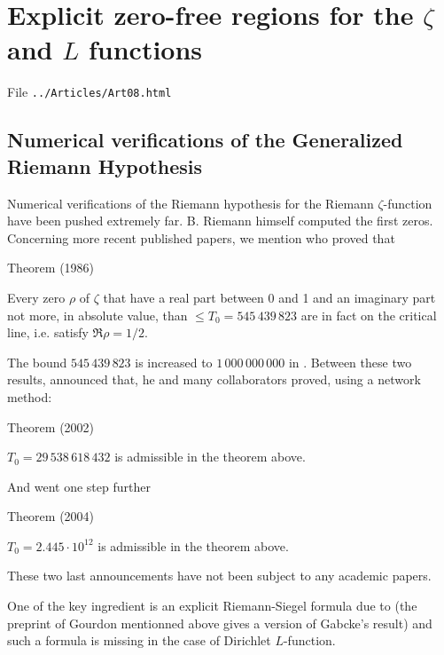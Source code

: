 \chapter{  Explicit zero-free regions for the $\zeta$ and $L$ functions}

File \texttt{../Articles/Art08.html}









\section{Numerical verifications of the Generalized Riemann Hypothesis
}


Numerical verifications of the Riemann hypothesis for the Riemann
$\zeta$-function have been pushed extremely far. B. Riemann himself computed the
first zeros. Concerning more recent published papers, we mention
\cite{Lune-Riele-Winter*86}
who proved that
\begin{thm}{Theorem (1986)}

  Every zero $\rho$ of $\zeta$ that have a real part between 0 and 1 and
  an imaginary part not more, in absolute value, than $\le T_0=545\,439\,823$
  are in fact on the critical line, i.e. satisfy $\Re \rho=1/2$.
\end{thm}

The bound $545\,439\,823$ is increased to $1\,000\,000\,000$ in
\cite{Platt*11}.
Between these two results, 
\cite{Wedeniwski*02}
announced that, he and many collaborators proved, using a network method:
\begin{thm}{Theorem (2002)}

  $T_0=29\,538\,618\,432$ is admissible in the theorem above.
\end{thm}

And
\cite{Gourdon-Demichel*04}
went one step further

\begin{thm}{Theorem (2004)}

  $T_0=2.445\cdot 10^{12}$ is admissible in the theorem above.
\end{thm}

These two last announcements have not been subject to any academic papers.

One of the key ingredient is an explicit Riemann-Siegel formula due to
\cite{Gabcke*79}
(the preprint of Gourdon mentionned above gives a version of Gabcke's result)
and such a formula is missing in the case of Dirichlet $L$-function.

